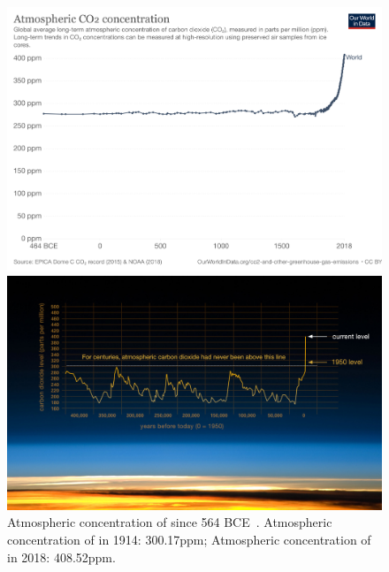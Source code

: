 \begin{figure}
\center
\includegraphics[scale=0.12]{img/intro_co2-concentration-long-term.png}
\caption{Atmospheric concentration of  since 564 BCE~\cite{bereiter2015revision}. Atmospheric concentration of  in 1914: 300.17ppm; Atmospheric concentration of  in 2018: 408.52ppm.}
\label{intro_co2-concentration-long-term}

\includegraphics[scale=0.33]{img/intro_nasa_co2.jpeg}
\end{figure}


